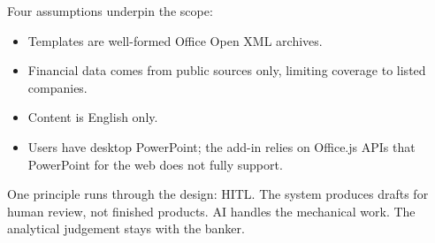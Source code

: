 Four assumptions underpin the scope:

\begin{itemize}
    \item Templates are well-formed Office Open XML archives.
    \item Financial data comes from public sources only, limiting coverage to listed companies.
    \item Content is English only.
    \item Users have desktop PowerPoint; the add-in relies on Office.js APIs that PowerPoint for the web does not fully support.
\end{itemize}

One principle runs through the design: HITL. The system produces drafts for human review, not finished products. AI handles the mechanical work. The analytical judgement stays with the banker.
